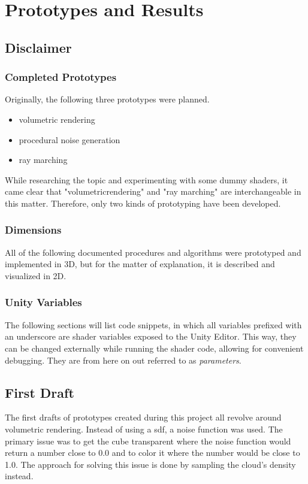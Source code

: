 \section{Prototypes and Results}

\subsection{Disclaimer}
\subsubsection{Completed Prototypes}
Originally, the following three prototypes were planned.
\begin{itemize}
    \item volumetric rendering
    \item procedural noise generation
    \item ray marching
\end{itemize}
While researching the topic and experimenting with some dummy shaders, it came clear that "\gls{volumetricrendering}" and "ray marching" are interchangeable in this matter.
Therefore, only two kinds of prototyping have been developed.

\subsubsection{Dimensions}
All of the following documented procedures and algorithms were prototyped and implemented in 3D, but for the matter of explanation, it is described and visualized in 2D.

\subsubsection{Unity Variables}
The following sections will list code snippets, in which all variables prefixed with an underscore are shader variables exposed to the Unity Editor. This way, they can be changed externally while running the shader code, allowing for convenient debugging.
They are from here on out referred to as \textit{\gls{parameters}}.

\clearpage
\subsection{First Draft}
The first drafts of prototypes created during this project all revolve around volumetric rendering. 
Instead of using a \gls{sdf}, a noise function was used. The primary issue was to get the cube transparent where the noise function would return a number close to 0.0 and to color it where the number would be close to 1.0.
The approach for solving this issue is done by sampling the cloud's density instead.


